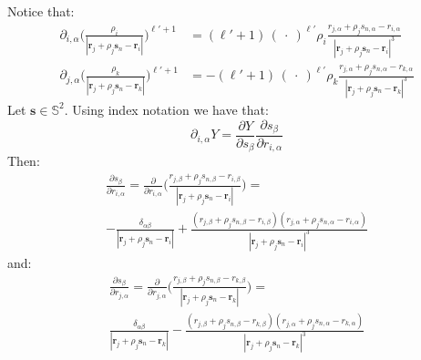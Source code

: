 \documentclass[12pt,letterpaper,oneside]{article}
\theoremstyle{definition}
\begin{document}
Notice that:
\begin{align*}
\partial_{i,\alpha} \bigg( \frac{\rho_i}{| \boldsymbol{r}_j + \rho_j \boldsymbol{s}_n - \boldsymbol{r}_i |} \bigg)^{\ell'+1} & =  (\ell'+1) \, (\: \cdot \: )^{\ell'} \rho_i \frac{ r_{j,\alpha} + \rho_j s_{n,\alpha} - r_{i,\alpha}}{| \boldsymbol{r}_j + \rho_j \boldsymbol{s}_n - \boldsymbol{r}_i |^3}  \\
\partial_{j,\alpha} \bigg( \frac{\rho_k}{| \boldsymbol{r}_j + \rho_j \boldsymbol{s}_n - \boldsymbol{r}_k |} \bigg)^{\ell'+1} & =  - (\ell'+1) \, (\: \cdot \: )^{\ell'} \rho_k \frac{ r_{j,\alpha} + \rho_j s_{n,\alpha} - r_{k,\alpha}}{| \boldsymbol{r}_j + \rho_j \boldsymbol{s}_n - \boldsymbol{r}_k |^3}
\end{align*}
Let $\boldsymbol{s} \in \mathbb{S}^2$. Using index notation we have that:
\[
\partial_{i,\alpha} Y= \frac{\partial Y}{\partial s_\beta} \frac{\partial s_\beta}{\partial r_{i,\alpha}}
\]
Then:
\begin{multline*}
\frac{\partial s_\beta}{\partial r_{i,\alpha}} = \frac{\partial}{\partial r_{i,\alpha}}  \bigg( \frac{{r}_{j,\beta} + \rho_j {s}_{n,\beta} - {r}_{i,\beta}}{| \boldsymbol{r}_j + \rho_j \boldsymbol{s}_n - \boldsymbol{r}_i |} \bigg) = \\
-\frac{\delta_{\alpha\beta}}{| \boldsymbol{r}_j + \rho_j \boldsymbol{s}_n - \boldsymbol{r}_i |} + \frac{({r}_{j,\beta} + \rho_j {s}_{n,\beta} - {r}_{i,\beta})({r}_{j,\alpha} + \rho_j {s}_{n,\alpha} - {r}_{i,\alpha})}{| \boldsymbol{r}_j + \rho_j \boldsymbol{s}_n - \boldsymbol{r}_i |^3}
\end{multline*}
and:
\begin{multline*}
\frac{\partial s_\beta}{\partial r_{j,\alpha}} = \frac{\partial}{\partial r_{j,\alpha}}  \bigg( \frac{{r}_{j,\beta} + \rho_j {s}_{n,\beta} - {r}_{k,\beta}}{| \boldsymbol{r}_j + \rho_j \boldsymbol{s}_n - \boldsymbol{r}_k |} \bigg) = \\
\frac{\delta_{\alpha\beta}}{| \boldsymbol{r}_j + \rho_j \boldsymbol{s}_n - \boldsymbol{r}_k |} - \frac{({r}_{j,\beta} + \rho_j {s}_{n,\beta} - {r}_{k,\beta})({r}_{j,\alpha} + \rho_j {s}_{n,\alpha} - {r}_{k,\alpha})}{| \boldsymbol{r}_j + \rho_j \boldsymbol{s}_n - \boldsymbol{r}_k |^3}
\end{multline*}
\end{document}
